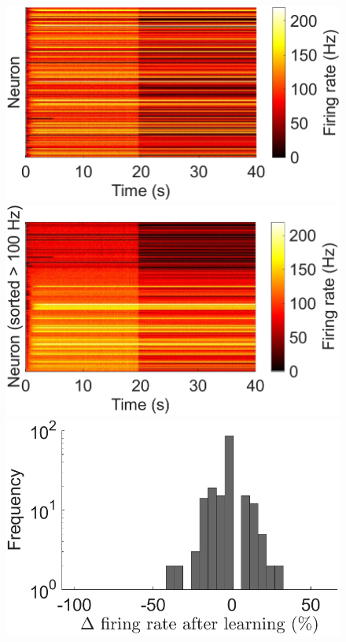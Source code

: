 \documentclass[utf8]{FrontiersinHarvard} %
\begin{document}
\begin{subfigure}
\setcounter{figure}{2}
\setcounter{subfigure}{0}
    \centering
    \begin{minipage}[b]{0.32\textwidth}
        \includegraphics[width=\linewidth]{rbSTDP/Hz}
        \caption{}
        \label{figs:results:firing_rate}
    \end{minipage}%
\setcounter{figure}{2}
\setcounter{subfigure}{1}
    \centering
    \begin{minipage}[b]{0.32\textwidth}
        \includegraphics[width=\linewidth]{rbSTDP/Hz_sorted}
        \caption{}
        \label{figs:results:firing_rate_sorted}
    \end{minipage}%
\setcounter{figure}{2}
\setcounter{subfigure}{2}
    \centering
    \begin{minipage}[b]{0.32\textwidth}
        \includegraphics[width=\linewidth]{rbSTDP/Hz_change_histogram}

\end{minipage}
\end{subfigure}
\end{document}
